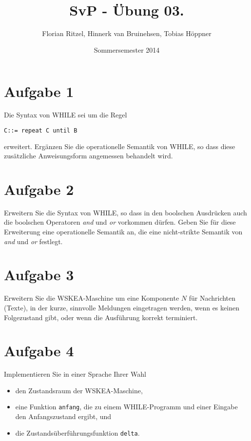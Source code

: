 \documentclass[ngerman,a4paper]{report}
\author{Florian Ritzel, Hinnerk van Bruinehsen, Tobias Höppner}
\title{SvP - Übung 03. }
\date{Sommersemester 2014}
\renewcommand{\maketitle}{}
\begin{document}
\maketitle
\section*{Aufgabe 1}
Die Syntax von WHILE sei um die Regel
\begin{lstlisting}
C::= repeat C until B
\end{lstlisting}
erweitert. Ergänzen Sie die operationelle Semantik von WHILE, so dass diese zusätzliche Anweisungsform angemessen behandelt wird.\\

\section*{Aufgabe 2}
Erweitern Sie die Syntax von WHILE, so dass in den boolschen Ausdrücken auch die boolschen Operatoren \textit{and} und \textit{or} vorkommen dürfen. Geben Sie für diese Erweiterung eine operationelle Semantik an, die eine nicht-strikte Semantik von \textit{and} und \textit{or} festlegt.\\

\section*{Aufgabe 3}
Erweitern Sie die WSKEA-Maschine um eine Komponente $N$ für Nachrichten (Texte), in der kurze, sinnvolle Meldungen eingetragen werden, wenn es keinen Folgezustand gibt, oder wenn die Ausführung korrekt terminiert.\\

\section*{Aufgabe 4 }
Implementieren Sie in einer Sprache Ihrer Wahl
\begin{itemize}
	\item den Zustandsraum der WSKEA-Maschine,
	\item eine Funktion \texttt{anfang}, die zu einem WHILE-Programm und einer Eingabe den Anfangszustand ergibt, und
	\item die Zustandsüberführungsfunktion \texttt{delta}.
\end{itemize}
\end{document}
